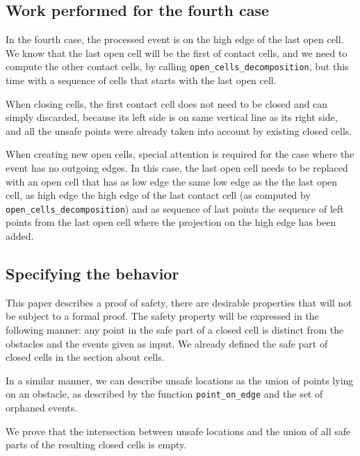 \documentclass[a4paper, USenglish, cleveref, autoref, thm-restate]{lipics-v2021}
\begin{document}
\subsection{Work performed for the fourth case}
In the fourth case, the processed event is on the high edge of the
last open cell.  We know that the last open cell will be the first of
contact cells, and we need to compute the other contact cells, by
calling {\tt open\_cells\_decomposition}, but this time with a sequence
of cells that starts with the last open cell.

When closing cells, the first contact cell does not need to be closed
and can simply discarded, because its left side is on same vertical line as
its right side, and all the unsafe points were already
taken into account by existing closed cells.

When creating new open cells, special attention is required for the
case where the event has no outgoing edges.  In this case, the last
open cell needs to be replaced with an open cell that has as low edge
the same low edge as the the last open cell, as high edge the high
edge of the last contact cell
(as computed by {\tt open\_cells\_decomposition}) and as sequence of
last points the sequence of left points from the last open cell where
the projection on the high edge has been added.

\subsection{Specifying the behavior}
This paper describes a proof of safety, there are desirable properties
that will not be subject to a formal proof.  The safety property will
be expressed in the following manner: any point in the safe part of a
closed cell is distinct from the obstacles and the events given as
input.  We already defined the safe part of closed cells in the
section about cells.

In a similar manner, we can describe unsafe locations as the union
of points lying
on an obstacle, as described by the function {\tt point\_on\_edge} and
the set of orphaned events.

We prove that the intersection between unsafe locations and the union
of all safe parts of the resulting closed cells is empty.
\end{document}
